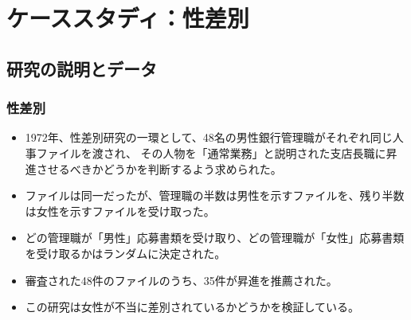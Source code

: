 
\section{ケーススタディ：性差別}


\subsection{研究の説明とデータ}


\begin{frame}[shrink=15]
\frametitle{性差別}

\begin{itemize}

\item 1972年、性差別研究の一環として、48名の男性銀行管理職がそれぞれ同じ人事ファイルを渡され、
その人物を「通常業務」と説明された支店長職に昇進させるべきかどうかを判断するよう求められた。

\item ファイルは同一だったが、管理職の半数は男性を示すファイルを、残り半数は女性を示すファイルを受け取った。

\item どの管理職が「男性」応募書類を受け取り、どの管理職が「女性」応募書類を受け取るかはランダムに決定された。

\item 審査された48件のファイルのうち、35件が昇進を推薦された。

\item この研究は女性が不当に差別されているかどうかを検証している。

\end{itemize}

 


\end{frame}



